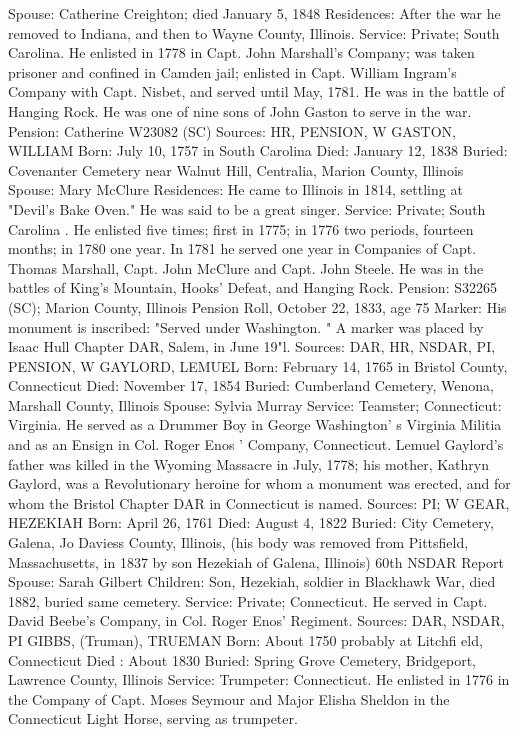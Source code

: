 Spouse: Catherine Creighton; died January 5, 1848 
Residences: After the war he removed to Indiana, and then to Wayne County, Illinois. 
Service: Private; South Carolina. He enlisted in 1778 in Capt. John Marshall's Company; was taken prisoner and confined in Camden jail; enlisted in Capt. William Ingram's Company with Capt. Nisbet, and served until May, 1781. He was in the battle of Hanging Rock. He was one of nine sons of John Gaston to serve in the war. 
Pension: Catherine W23082 (SC) 
Sources: HR, PENSION, W 
GASTON, WILLIAM 
Born: July 10, 1757 in South Carolina 
Died: January 12, 1838 
Buried: Covenanter Cemetery near Walnut Hill, Centralia, Marion County, Illinois 
Spouse: Mary McClure 
Residences: He came to Illinois in 1814, settling at "Devil's Bake Oven." He was said to be a great singer. 
Service: Private; South Carolina . He enlisted five times; first in 1775; in 1776 two periods, fourteen months; in 1780 one year. In 1781 he served one year in Companies of Capt. Thomas Marshall, Capt. John McClure and Capt. 
John Steele. He was in the battles of King's Mountain, Hooks' Defeat, and Hanging Rock. 
Pension: S32265 (SC); Marion County, Illinois Pension Roll, October 22, 1833, age 75 
Marker: His monument is inscribed: "Served under Washington. " A marker was placed by Isaac Hull Chapter DAR, Salem, in June 19"l. 
Sources: DAR, HR, NSDAR, PI, PENSION, W 
GAYLORD, LEMUEL 
Born: February 14, 1765 in Bristol County, Connecticut Died: November 17, 1854 Buried: Cumberland Cemetery, Wenona, Marshall County, Illinois 
Spouse: Sylvia Murray 
Service: Teamster; Connecticut: Virginia. He served as a Drummer Boy in George Washington' s Virginia Militia and as an Ensign in Col. Roger Enos ' Com­pany, Connecticut.  Lemuel Gaylord's father was killed in the Wyoming Massacre in July, 1778; his mother, Kathryn Gaylord, was a Revolutionary heroine for whom a mon­ument was erected, and for whom the Bristol Chapter DAR in Connecticut is named. 
Sources: PI; W 
GEAR, HEZEKIAH 
Born: April 26, 1761 
Died: August 4, 1822 
Buried: City Cemetery, Galena, Jo Daviess County, Illinois, (his body was re­moved from Pittsfield, Massachusetts, in 1837 by son Hezekiah of Galena, Illinois) 60th NSDAR Report 
Spouse: Sarah Gilbert 
Children: Son, Hezekiah, soldier in Blackhawk War, died 1882, buried same cemetery. 
Service: Private; Connecticut. He served in Capt. David Beebe's Company, in Col. Roger Enos' Regiment. 
Sources: DAR, NSDAR, PI 
GIBBS, (Truman), TRUEMAN 
Born: About 1750 probably at Litchfi eld, Connecticut Died : About 1830 Buried: Spring Grove Cemetery, Bridgeport, Lawrence County, Illinois Service: Trumpeter: Connecticut. He enlisted in 1776 in the Company of Capt. Moses Seymour and Major Elisha Sheldon in the Connecticut Light Horse, serving as trumpeter. 
